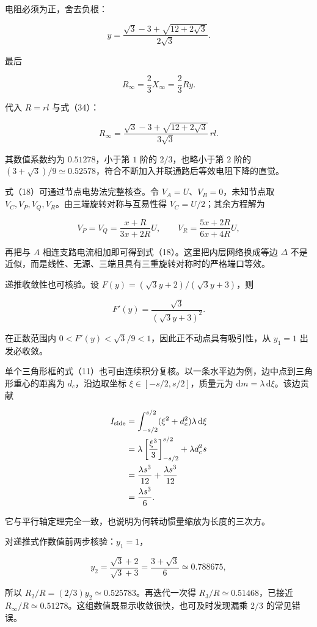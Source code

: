 \documentclass[12pt,a4paper,UTF8]{ctexart}
\begin{document}
电阻必须为正，舍去负根：

\[
y=\frac{\sqrt3-3+\sqrt{12+2\sqrt3}}{2\sqrt3}. \tag{34}
\]

最后

\[
R_\infty=\frac23X_\infty
=\frac23Ry. \tag{35}
\]

代入 \(R=rl\) 与式（34）：

\[
\boxed{
R_\infty
=\frac{\sqrt3-3+\sqrt{12+2\sqrt3}}
{3\sqrt3}\,rl}. \tag{36}
\]

其数值系数约为 \(0.51278\)，小于第 \(1\) 阶的 \(2/3\)，也略小于第 \(2\)
阶的
\((3+\sqrt3)/9\simeq0.52578\)，符合不断加入并联通路后等效电阻下降的直觉。

式（18）可通过节点电势法完整核查。令 \(V_A=U\)、\(V_B=0\)，未知节点取
\(V_C,V_P,V_Q,V_R\)。由三端旋转对称与互易性得 \(V_C=U/2\)；其余方程解为

\[
V_P=V_Q=\frac{x+R}{3x+2R}U,\qquad
V_R=\frac{5x+2R}{6x+4R}U,
\]

再把与 \(A\) 相连支路电流相加即可得到式（18）。这里把内层网络换成等边
\(\Delta\)
不是近似，而是线性、无源、三端且具有三重旋转对称时的严格端口等效。

递推收敛性也可核验。设 \(F(y)=(\sqrt3y+2)/(\sqrt3y+3)\)，则

\[
F'(y)=\frac{\sqrt3}{(\sqrt3y+3)^2}.
\]

在正数范围内 \(0<F'(y)<\sqrt3/9<1\)，因此正不动点具有吸引性，从
\(y_1=1\) 出发必收敛。

单个三角形框的式（11）也可由连续积分复核。以一条水平边为例，边中点到三角形重心的距离为
\(d_c\)，沿边取坐标 \(\xi\in[-s/2,s/2]\)，质量元为
\(\mathrm dm=\lambda\,\mathrm d\xi\)。该边贡献

\[
\begin{aligned}
I_{\rm side}
&=\int_{-s/2}^{s/2}(\xi^2+d_c^2)\lambda\,\mathrm d\xi\\
&=\lambda\left[\frac{\xi^3}{3}\right]_{-s/2}^{s/2}
+\lambda d_c^2s\\
&=\frac{\lambda s^3}{12}+\frac{\lambda s^3}{12}\\
&=\frac{\lambda s^3}{6}.
\end{aligned}
\]

它与平行轴定理完全一致，也说明为何转动惯量缩放为长度的三次方。

对递推式作数值前两步核验：\(y_1=1\)，

\[
y_2=\frac{\sqrt3+2}{\sqrt3+3}
=\frac{3+\sqrt3}{6}\simeq0.788675,
\]

所以 \(R_2/R=(2/3)y_2\simeq0.525783\)。再迭代一次得
\(R_3/R\simeq0.51468\)，已接近
\(R_\infty/R\simeq0.51278\)。这组数值既显示收敛很快，也可及时发现漏乘
\(2/3\) 的常见错误。
\end{document}
